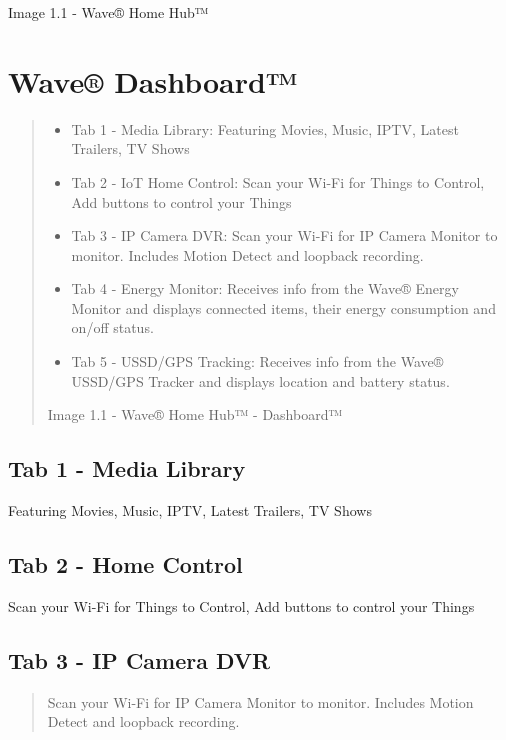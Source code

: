 \documentclass[letterpaper,10pt,openany,oneside,english]{sphinxmanual}
\begin{document}
Image 1.1 - Wave® Home Hub™

\noindent{}


\section{Wave® Dashboard™}
\label{\detokenize{introduction:wave-dashboard}}\begin{quote}
\begin{itemize}
\item {} 
Tab 1 - Media Library: Featuring Movies, Music, IPTV, Latest Trailers, TV Shows

\item {} 
Tab 2 - IoT Home Control: Scan your Wi-Fi for Things to Control, Add buttons to control your Things

\item {} 
Tab 3 - IP Camera DVR: Scan your Wi-Fi for IP Camera Monitor to monitor. Includes Motion Detect and loopback recording.

\item {} 
Tab 4 - Energy Monitor: Receives info from the Wave® Energy Monitor and displays connected items, their energy consumption and on/off status.

\item {} 
Tab 5 - USSD/GPS Tracking: Receives info from the  Wave® USSD/GPS Tracker and displays location and battery status.

\end{itemize}

Image 1.1 - Wave® Home Hub™ - Dashboard™
\end{quote}

\noindent{}


\subsection{Tab 1 - Media Library}
\label{\detokenize{introduction:tab-1-media-library}}
Featuring Movies, Music, IPTV, Latest Trailers, TV Shows


\subsection{Tab 2 - Home Control}
\label{\detokenize{introduction:tab-2-home-control}}
Scan your Wi-Fi for Things to Control, Add buttons to control your Things


\subsection{Tab 3 - IP Camera DVR}
\label{\detokenize{introduction:tab-3-ip-camera-dvr}}\begin{quote}

Scan your Wi-Fi for IP Camera Monitor to monitor. Includes Motion Detect and loopback recording.
\end{quote}
\end{document}
